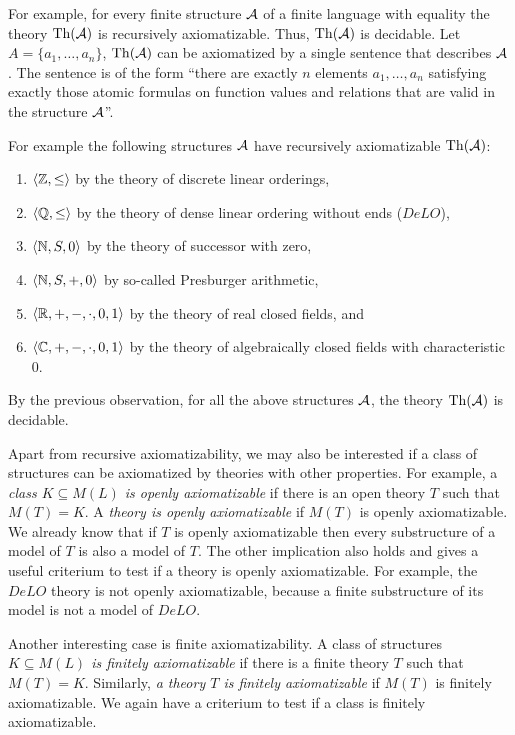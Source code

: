 For example, for every finite structure $\mathcal{A}$ of a finite language with equality the theory $\operatorname{Th}(\mathcal{A})$ is recursively axiomatizable. Thus, $\operatorname{Th}(\mathcal{A})$ is decidable. Let $A = \{a_1, \dots, a_n\}$, $\operatorname{Th}(\mathcal{A})$ can be axiomatized by a single sentence that describes $\mathcal{A}$. The sentence is of the form ``there are exactly $n$ elements $a_1, \dots, a_n$ satisfying exactly those atomic formulas on function values and relations that are valid in the structure $\mathcal{A}$''.

For example the following structures $\mathcal{A}$ have recursively axiomatizable $\operatorname{Th}(\mathcal{A})$:
\begin{enumerate}
  \item $\langle \mathbb{Z}, \leq \rangle$ by the theory of discrete linear orderings, 
  \item $\langle \mathbb{Q}, \leq \rangle$ by the theory of dense linear ordering without ends ($DeLO$),
  \item $\langle \mathbb{N}, S, 0 \rangle$ by the theory of successor with zero, 
  \item $\langle \mathbb{N}, S, +, 0 \rangle$ by so-called Presburger arithmetic, 
  \item $\langle {\ensuremath{\mathbb{R}}}, +, -, \cdot, 0, 1 \rangle$ by the theory of real closed fields, and 
  \item $\langle \mathbb{C}, +, -, \cdot, 0, 1 \rangle$ by the theory of algebraically closed fields with characteristic 0.
\end{enumerate}
By the previous observation, for all the above structures $\mathcal{A}$, the theory $\operatorname{Th}(\mathcal{A})$ is decidable.

Apart from recursive axiomatizability, we may also be interested if a class of structures can be axiomatized by theories with other properties. For example, a \emph{class $K \subseteq M(L)$ is openly axiomatizable} if there is an open theory $T$ such that $M(T) = K$. A \emph{theory is openly axiomatizable} if $M(T)$ is openly axiomatizable. We already know that if $T$ is openly axiomatizable then every substructure of a model of $T$ is also a model of $T$. The other implication also holds and gives a useful criterium to test if a theory is openly axiomatizable. For example, the $DeLO$ theory is not openly axiomatizable, because a finite substructure of its model is not a model of $DeLO$.

Another interesting case is finite axiomatizability. A class of structures \emph{$K \subseteq M(L)$ is finitely axiomatizable} if there is a finite theory $T$ such that $M(T) = K$. Similarly, \emph{a theory $T$ is finitely axiomatizable} if $M(T)$ is finitely axiomatizable. We again have a criterium to test if a class is finitely axiomatizable.

